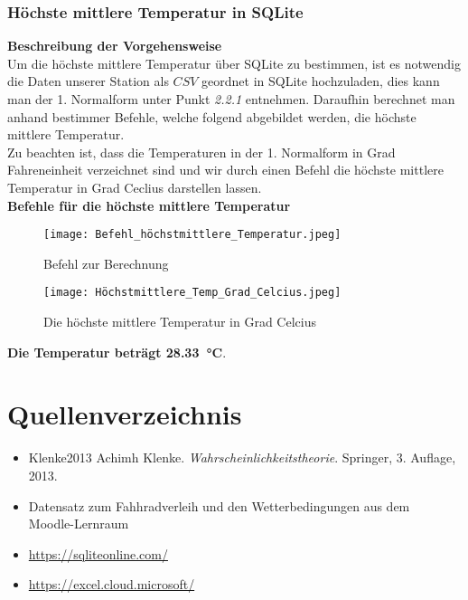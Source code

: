\documentclass[a4paper,12pt]{article}
\begin{document}
\subsubsection{Höchste mittlere Temperatur in SQLite}
\textbf{Beschreibung der Vorgehensweise}\\Um die höchste mittlere Temperatur über SQLite zu bestimmen, ist es notwendig die Daten unserer Station als $CSV$ geordnet in SQLite hochzuladen, dies kann man der 1. Normalform unter Punkt \textit{2.2.1} entnehmen. Daraufhin berechnet man anhand bestimmer Befehle, welche folgend abgebildet werden, die höchste mittlere Temperatur.\\ Zu beachten ist, dass die Temperaturen in der 1. Normalform in Grad Fahreneinheit verzeichnet sind und wir durch einen Befehl die höchste mittlere Temperatur in Grad Ceclius darstellen lassen.
\vspace{0.5cm}
\\ \textbf{Befehle für die höchste mittlere Temperatur}



\begin{figure}[h]
    \centering
    \texttt{[image: Befehl\_höchstmittlere\_Temperatur.jpeg]}
    \caption{Befehl zur Berechnung}
    \label{fig:enter-label}
\end{figure}

    
\begin{center}
    
\begin{figure}[h]
    \centering
    \texttt{[image: Höchstmittlere\_Temp\_Grad\_Celcius.jpeg]}
    \caption{Die höchste mittlere Temperatur in Grad Celcius}
    \label{fig:enter-label}
\end{figure}
\textbf{Die Temperatur beträgt \SI{28,33}{\degreeCelsius}}.
\end{center}

\newpage
\section{Quellenverzeichnis}

\begin{itemize}

\item Klenke2013  Achimh Klenke. \textit{Wahrscheinlichkeitstheorie}. Springer, 3. Auflage, 2013.
 \item Datensatz zum Fahhradverleih und den Wetterbedingungen aus dem\\Moodle-Lernraum
 \item \url{ https://sqliteonline.com/}
 \item \url{ https://excel.cloud.microsoft/}
\end{itemize}
\end{document}

